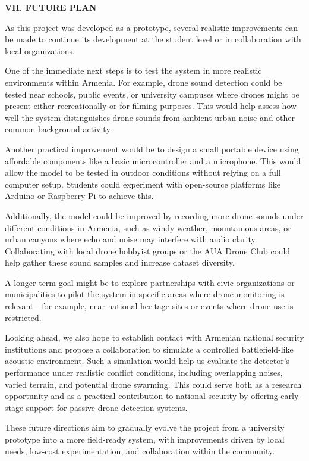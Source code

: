 \documentclass[12pt]{article}
\begin{document}
\begin{center}
{\fontsize{9}{11}\selectfont\bfseries VII. FUTURE PLAN}
\end{center}

\vspace{0.2em}

{\fontsize{9}{11}\selectfont
\indent As this project was developed as a prototype, several realistic improvements can be made to continue its development at the student level or in collaboration with local organizations.

One of the immediate next steps is to test the system in more realistic environments within Armenia. For example, drone sound detection could be tested near schools, public events, or university campuses where drones might be present either recreationally or for filming purposes. This would help assess how well the system distinguishes drone sounds from ambient urban noise and other common background activity.

Another practical improvement would be to design a small portable device using affordable components like a basic microcontroller and a microphone. This would allow the model to be tested in outdoor conditions without relying on a full computer setup. Students could experiment with open-source platforms like Arduino or Raspberry Pi to achieve this.

Additionally, the model could be improved by recording more drone sounds under different conditions in Armenia, such as windy weather, mountainous areas, or urban canyons where echo and noise may interfere with audio clarity. Collaborating with local drone hobbyist groups or the AUA Drone Club could help gather these sound samples and increase dataset diversity.

A longer-term goal might be to explore partnerships with civic organizations or municipalities to pilot the system in specific areas where drone monitoring is relevant—for example, near national heritage sites or events where drone use is restricted.

Looking ahead, we also hope to establish contact with Armenian national security institutions and propose a collaboration to simulate a controlled battlefield-like acoustic environment. Such a simulation would help us evaluate the detector’s performance under realistic conflict conditions, including overlapping noises, varied terrain, and potential drone swarming. This could serve both as a research opportunity and as a practical contribution to national security by offering early-stage support for passive drone detection systems.

These future directions aim to gradually evolve the project from a university prototype into a more field-ready system, with improvements driven by local needs, low-cost experimentation, and collaboration within the community.

}
\end{document}
